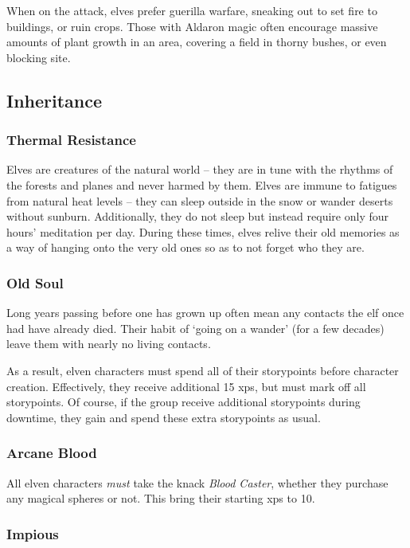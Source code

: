 \begin{multicols}{2}
When on the attack, elves prefer guerilla warfare, sneaking out to set fire to buildings, or ruin crops.
Those with Aldaron magic often encourage massive amounts of plant growth in an area, covering a field in thorny bushes, or even blocking site.

\subsection{Inheritance}

\subsubsection{Thermal Resistance}

Elves are creatures of the natural world -- they are in tune with the rhythms of the forests and planes and never harmed by them.
Elves are immune to \glspl{fatigue} from natural heat levels -- they can sleep outside in the snow or wander deserts without sunburn.
Additionally, they do not sleep but instead require only four hours' meditation per day.
During these times, elves relive their old memories as a way of hanging onto the very old ones so as to not forget who they are.

\subsubsection{Old Soul}

Long years passing before one has grown up often mean any contacts the elf once had have already died.
Their habit of `going on a wander' (for a few decades) leave them with nearly no living contacts.

As a result, elven characters must spend all of their \glspl{storypoint} before character creation.
Effectively, they receive additional 15 \glspl{xp}, but must mark off all \glspl{storypoint}.
Of course, if the group receive additional \glspl{storypoint} during \gls{downtime}, they gain and spend these extra \glspl{storypoint} as usual.

\subsubsection{Arcane Blood}

All elven characters \emph{must} take the knack \textit{Blood Caster}, whether they purchase any magical spheres or not.
This bring their starting \glspl{xp} to 10.

\subsubsection{Impious}


\end{multicols}
